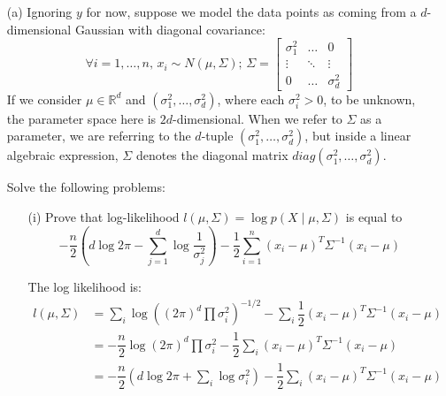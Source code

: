 \documentclass{article}
\begin{document}
    \begin{itemize}
        \item [(a)] Ignoring $y$ for now, suppose we model the data points as coming from a $d$-dimensional Gaussian with diagonal covariance:
            \begin{equation*}
                \forall i = 1, \ldots, n, \, x_{i} \sim N(\mu, \Sigma); \, \Sigma = \begin{bmatrix}
                    \sigma_{1}^{2} & \ldots & 0              \\
                    \vdots         & \ddots & \vdots         \\
                    0              & \ldots & \sigma^{2}_{d}   
                \end{bmatrix}
            \end{equation*}
        If we consider $\mu \in \mathbb{R}^{d}$ and $(\sigma^{2}_{1}, \ldots, \sigma^{2}_{d})$, where each $\sigma^{2}_{i} > 0$, to be unknown, the parameter space here is $2d$-dimensional. When we refer to $\Sigma$ as a parameter, we are referring to the $d$-tuple $(\sigma_{1}^{2}, \ldots, \sigma^{2}_{d})$, but inside a linear algebraic expression, $\Sigma$ denotes the diagonal matrix $diag(\sigma_{1}^{2}, \ldots, \sigma^{2}_{d})$.

        Solve the following problems:
            \begin{itemize}
                \item [(i)] Prove that log-likelihood $l(\mu, \Sigma) = \log{p(X \mid \mu, \Sigma)}$ is equal to
                    \begin{equation*}
                        -\dfrac{n}{2} \left(d \log{2\pi} - \sum_{j = 1}^{d} \log{ \dfrac{1}{\sigma^{2}_{j}}}\right) - \dfrac{1}{2}\sum_{i = 1}^{n}(x_{i} - \mu)^{T}\Sigma^{-1}(x_{i} - \mu)
                    \end{equation*}
                    \begin{answer}
                        The log likelihood is:
                            \begin{align*}
                                l(\mu, \Sigma) &= \sum_{i} \log{((2\pi)^{d}\prod\sigma_{i}^{2})^{-1/2}} - \sum_{i}\dfrac{1}{2}(x_{i} - \mu)^{T}\Sigma^{-1}(x_{i} - \mu)                \\
                                               &= -\dfrac{n}{2}\log{(2\pi)^{d}\prod\sigma_{i}^{2}} - \dfrac{1}{2}\sum_{i}(x_{i} - \mu)^{T}\Sigma^{-1}(x_{i} - \mu)                     \\
                                               &= -\dfrac{n}{2}\left(d\log{2\pi} + \sum_{i}\log{\sigma_{i}^{2}}\right) - \dfrac{1}{2}\sum_{i}(x_{i} - \mu)^{T}\Sigma^{-1}(x_{i} - \mu)   
                            \end{align*}
                    \end{answer}


\end{itemize}
\end{itemize}
\end{document}
